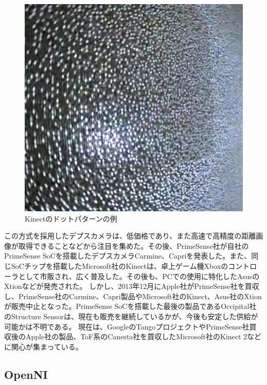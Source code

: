 \begin{figure}[htp]
  \centering
  \includegraphics[width=\columnwidth]{pictures/chapter8/pic_08_15.png}
  \caption{Kinectのドットパターンの例}
\end{figure}


この方式を採用したデプスカメラは、低価格であり、また高速で高精度の距離画像が取得できることなどから注目を集めた。その後、PrimeSense社が自社のPrimeSense SoCを搭載したデプスカメラCarmine、Capriを発表した。また、同じSoCチップを搭載したMicrosoft社のKinectは、卓上ゲーム機Xboxのコントローラとして市販され、広く普及した。その後も、PCでの使用に特化したAsusのXtionなどが発売された。
しかし、2013年12月にApple社がPrimeSense社を買収し、PrimeSense社のCarmine、Capri製品やMicrosoft社のKinect、Asus社のXtionが販売中止となった。PrimeSense SoCを搭載した最後の製品であるOccipital社のStructure Sensorは、現在も販売を継続しているかが、今後も安定した供給が可能かは不明である。
現在は、GoogleのTangoプロジェクトやPrimeSense社買収後のApple社の製品、ToF系のCanesta社を買収したMicrosoft社のKinect 2などに関心が集まっている。

\subsection{OpenNI}

